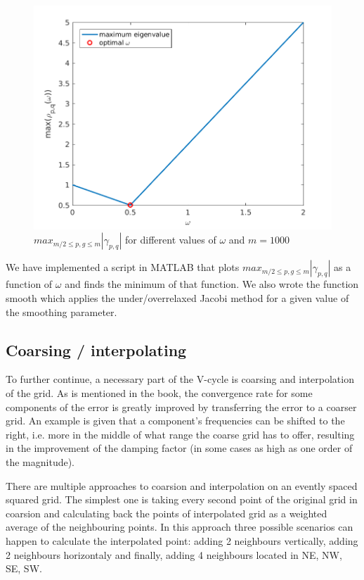 \documentclass[main.tex]{subfiles}
\begin{document}
\begin{figure}[h]
    \centering
    \includegraphics[width=\textwidth]{../Figures/omegaopt}
    \caption{$max_{m/2 \leq p,g \leq m} |\gamma_{p,q}|$ for different values of $\omega$ and $m = 1000$}
    \label{fig:omegaopt}
\end{figure}

We have implemented a script in MATLAB that plots $max_{m/2 \leq p,g \leq m} |\gamma_{p,q}|$ as a function of $\omega$ and finds the minimum of that function. We also wrote the function smooth which applies the under/overrelaxed Jacobi method for a given value of the smoothing parameter.

\subsection{Coarsing / interpolating}
To further continue, a necessary part of the V-cycle is coarsing and interpolation of the grid. As is mentioned in the book, the convergence rate for some components of the error is greatly improved by transferring the error to a coarser grid. An example is given that a component's frequencies can be shifted to the right, i.e. more in the middle of what range the coarse grid has to offer, resulting in the improvement of the damping factor (in some cases as high as one order of the magnitude).

There are multiple approaches to coarsion and interpolation on an evently spaced squared grid. The simplest one is taking every second point of the original grid in coarsion and calculating back the points of interpolated grid as a weighted average of the neighbouring points. In this approach three possible scenarios can happen to calculate the interpolated point: adding 2 neighbours vertically, adding 2 neighbours horizontaly and finally, adding 4 neighbours located in NE, NW, SE, SW.
\end{document}
